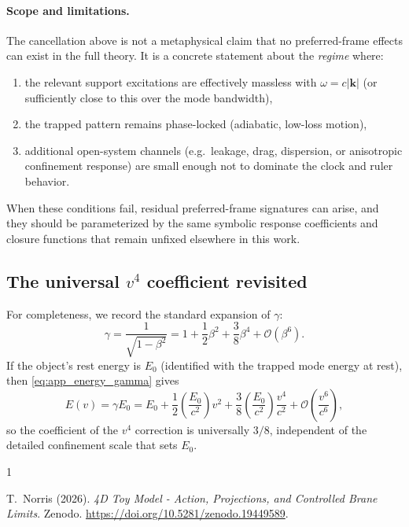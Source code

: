 \documentclass[11pt]{article}
\begin{document}
\paragraph{Scope and limitations.}
The cancellation above is not a metaphysical claim that no preferred-frame
effects can exist in the full theory. It is a concrete statement about the
\emph{regime} where:
\begin{enumerate}
\item the relevant support excitations are effectively massless with
$\omega=c|\mathbf k|$ (or sufficiently close to this over the mode bandwidth),
\item the trapped pattern remains phase-locked (adiabatic, low-loss motion),
\item additional open-system channels (e.g.\ leakage, drag, dispersion, or
anisotropic confinement response) are small enough not to dominate the clock and
ruler behavior.
\end{enumerate}
When these conditions fail, residual preferred-frame signatures can arise, and
they should be parameterized by the same symbolic response coefficients and
closure functions that remain unfixed elsewhere in this work.

\subsection{The universal \texorpdfstring{$v^4$}{v\string^4} coefficient revisited}
\label{app:standing_wave_v4}

For completeness, we record the standard expansion of $\gamma$:
\begin{equation}
\gamma
= \frac{1}{\sqrt{1-\beta^2}}
= 1 + \frac{1}{2}\beta^2 + \frac{3}{8}\beta^4 + \mathcal O(\beta^6).
\label{eq:app_gamma_series}
\end{equation}
If the object's rest energy is $E_0$ (identified with the trapped mode energy at
rest), then \eqref{eq:app_energy_gamma} gives
\begin{equation}
E(v)
= \gamma E_0
= E_0 + \frac{1}{2}\left(\frac{E_0}{c^2}\right)v^2
+ \frac{3}{8}\left(\frac{E_0}{c^2}\right)\frac{v^4}{c^2}
+ \mathcal O\!\left(\frac{v^6}{c^6}\right),
\label{eq:app_energy_series}
\end{equation}
so the coefficient of the $v^4$ correction is universally $3/8$, independent of
the detailed confinement scale that sets $E_0$.


\begin{thebibliography}{1}

T.~Norris (2026).
\newblock \emph{4D Toy Model - Action, Projections, and Controlled Brane Limits}.
\newblock Zenodo.
\newblock \href{https://doi.org/10.5281/zenodo.19449589}{https://doi.org/10.5281/zenodo.19449589}.

\end{thebibliography}
\end{document}
